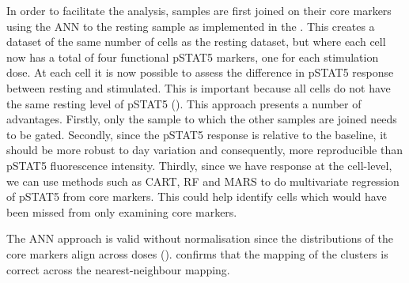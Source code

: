 In order to facilitate the analysis, samples are first joined on their core markers using the \gls{ANN} to the resting sample \citep{Jones:2011ez}
as implemented in the .
This creates a dataset of the same number of cells as the resting dataset, but where each cell now has a total of four functional pSTAT5 markers,
one for each stimulation dose.
At each cell it is now possible to assess the difference in pSTAT5 response between resting and stimulated.
This is important because all cells do not have the same resting level of pSTAT5 ().
This approach presents a number of advantages.
Firstly, only the sample to which the other samples are joined needs to be gated.
Secondly, since the pSTAT5 response is relative to the baseline, it should be more robust to day variation
and consequently, more reproducible than pSTAT5 fluorescence intensity.
Thirdly, since we have response at the cell-level, we can use methods
such as \gls{CART}, \gls{RF} and \gls{MARS} to do multivariate regression of pSTAT5 from core markers.
This could help identify cells which would have been missed from only examining core markers.


The \gls{ANN} approach is valid without normalisation since the distributions of the core markers align across doses ().
 confirms that the mapping of the clusters is correct across the nearest-neighbour mapping.






